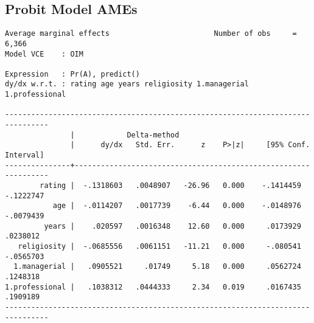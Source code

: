 \documentclass{article}
\begin{document}
\hypertarget{probitame}{\subsection*{Probit Model AMEs}}
\begin{verbatim}
Average marginal effects                        Number of obs     =      6,366
Model VCE    : OIM

Expression   : Pr(A), predict()
dy/dx w.r.t. : rating age years religiosity 1.managerial 1.professional

--------------------------------------------------------------------------------
               |            Delta-method
               |      dy/dx   Std. Err.      z    P>|z|     [95% Conf. Interval]
---------------+----------------------------------------------------------------
        rating |  -.1318603   .0048907   -26.96   0.000    -.1414459   -.1222747
           age |  -.0114207   .0017739    -6.44   0.000    -.0148976   -.0079439
         years |    .020597   .0016348    12.60   0.000     .0173929    .0238012
   religiosity |  -.0685556   .0061151   -11.21   0.000     -.080541   -.0565703
  1.managerial |   .0905521     .01749     5.18   0.000     .0562724    .1248318
1.professional |   .1038312   .0444333     2.34   0.019     .0167435    .1909189
--------------------------------------------------------------------------------
\end{verbatim}
\end{document}
